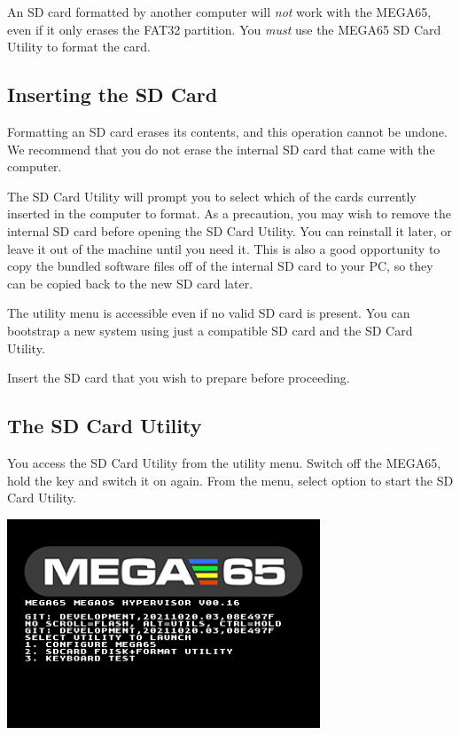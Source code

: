 An SD card formatted by another computer will {\em not} work with the MEGA65, even if it only erases the FAT32 partition. You {\em must} use the MEGA65 SD Card Utility to format the card.

\subsection{Inserting the SD Card}

Formatting an SD card erases its contents, and this operation cannot be undone. We recommend that you do not erase the internal SD card that came with the computer.

The SD Card Utility will prompt you to select which of the cards currently inserted in the computer to format. As a precaution, you may wish to remove the internal SD card before opening the SD Card Utility. You can reinstall it later, or leave it out of the machine until you need it. This is also a good opportunity to copy the bundled software files off of the internal SD card to your PC, so they can be copied back to the new SD card later.

The utility menu is accessible even if no valid SD card is present. You can bootstrap a new system using just a compatible SD card and the SD Card Utility.

Insert the SD card that you wish to prepare before proceeding.

\subsection{The SD Card Utility}

You access the SD Card Utility from the utility menu. Switch off the MEGA65, hold the  key and switch it on again. From the menu, select option  to start the SD Card Utility.

\begin{center}
\includegraphics[width=0.7\textwidth]{images/ss-utilmenu.png}
\end{center}

